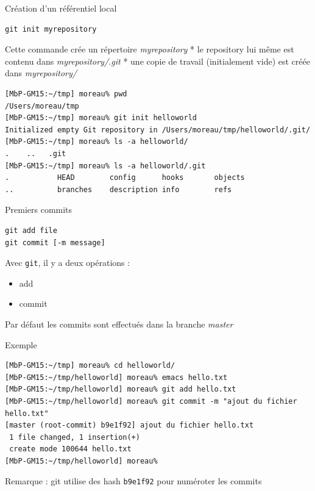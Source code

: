\begin{frame}[fragile]{%
\protect\hypertarget{cruxe9ation-dun-ruxe9fuxe9rentiel-local}{%
Création d’un référentiel local}}

\begin{verbatim}
git init myrepository
\end{verbatim}

Cette commande crée un répertoire \emph{myrepository} * le repository
lui même est contenu dans \emph{myrepository/.git} * une copie de
travail (initialement vide) est créée dans \emph{myrepository/}

\begin{verbatim}
[MbP-GM15:~/tmp] moreau% pwd
/Users/moreau/tmp
[MbP-GM15:~/tmp] moreau% git init helloworld
Initialized empty Git repository in /Users/moreau/tmp/helloworld/.git/
[MbP-GM15:~/tmp] moreau% ls -a helloworld/
.    ..   .git
[MbP-GM15:~/tmp] moreau% ls -a helloworld/.git
.           HEAD        config      hooks       objects
..          branches    description info        refs
\end{verbatim}

\end{frame}

\begin{frame}[fragile]{%
\protect\hypertarget{premiers-commits}{%
Premiers commits}}

\begin{verbatim}
git add file
git commit [-m message]
\end{verbatim}

Avec \texttt{git}, il y a deux opérations :

\begin{itemize}
\tightlist
\item
  add
\item
  commit
\end{itemize}

Par défaut les commits sont effectués dans la branche \emph{master}

\end{frame}

\begin{frame}[fragile]{%
\protect\hypertarget{exemple}{%
Exemple}}

\begin{verbatim}
[MbP-GM15:~/tmp] moreau% cd helloworld/
[MbP-GM15:~/tmp/helloworld] moreau% emacs hello.txt
[MbP-GM15:~/tmp/helloworld] moreau% git add hello.txt
[MbP-GM15:~/tmp/helloworld] moreau% git commit -m "ajout du fichier hello.txt"
[master (root-commit) b9e1f92] ajout du fichier hello.txt
 1 file changed, 1 insertion(+)
 create mode 100644 hello.txt
[MbP-GM15:~/tmp/helloworld] moreau%
\end{verbatim}

Remarque : git utilise des hash \texttt{b9e1f92} pour numéroter les
commits

\end{frame}

